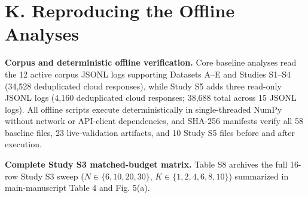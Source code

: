 \section*{K. Reproducing the Offline Analyses}

\textbf{Corpus and deterministic offline verification.} Core baseline analyses read the 12 active corpus JSONL logs supporting Datasets A--E and Studies S1--S4 (34,528 deduplicated cloud responses), while Study S5 adds three read-only JSONL logs (4,160 deduplicated cloud responses; 38,688 total across 15 JSONL logs). All offline scripts execute deterministically in single-threaded NumPy without network or API-client dependencies, and SHA-256 manifests verify all 58 baseline files, 23 live-validation artifacts, and 10 Study S5 files before and after execution.


\textbf{Complete Study S3 matched-budget matrix.} Table S8 archives the full 16-row Study S3 sweep ($N \in \{6, 10, 20, 30\}$, $K \in \{1, 2, 4, 6, 8, 10\}$) summarized in main-manuscript Table 4 and Fig. 5(a).


